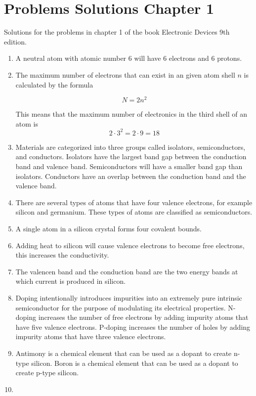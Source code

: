 \documentclass[fleqn]{article}
\begin{document}
\section*{Problems Solutions Chapter 1}
Solutions for the problems in chapter 1 of the book Electronic Devices 9th edition.

\begin{enumerate}[label=\textbf{\arabic*.}]

\item A neutral atom with atomic number 6 will have 6 electrons and 6 protons. 
  
\item The maximum number of electrons that can exist in an given atom shell $ n $ is calculated by the formula

\[
  N = 2n^2
\]

This means that the maximum number of electronics in the third shell of an atom is
\[ 
  2 \cdot 3^2 = 2 \cdot 9 = 18
\]

\item
Materials are categorized into three groups called isolators, semiconductors, and conductors. Isolators have the largest band gap between the conduction band and valence band. Semiconductors will have a smaller band gap than isolators. Conductors have an overlap between the conduction band and the valence band.

\item
There are several types of atoms that have four valence electrons, for example silicon and germanium. These types of atoms are classified as semiconductors.

\item
A single atom in a silicon crystal forms four covalent bounds.

\item
Adding heat to silicon will cause valence electrons to become free electrons, this increases the conductivity.

\item
The valencen band and the conduction band are the two energy bands at which current is produced in silicon.

\item
Doping intentionally introduces impurities into an extremely pure intrinsic semiconductor for the purpose of modulating its electrical properties. N-doping increases the number of free electrons by adding impurity atoms that have five valence electrons. P-doping increases the number of holes by adding impurity atoms that have three valence electrons.

\item
Antimony is a chemical element that can be used as a dopant to create n-type silicon. Boron is a chemical element that can be used as a dopant to create p-type silicon.

\item



\end{enumerate}
\end{document}

